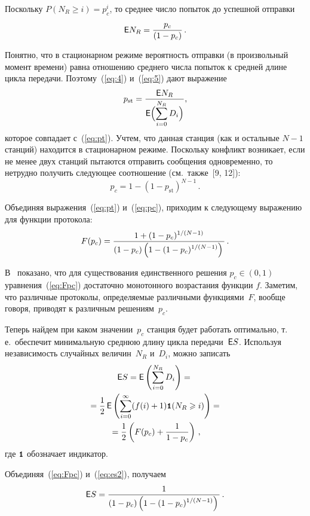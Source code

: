 \begin{multicols}{2}
Поскольку $P(N_R\ge i)= p_c^i$, то среднее число попыток до успешной
отправки 
\begin{eqnarray}
{\sf E} N_R =\displaystyle\frac{\displaystyle p_c\mathstrut}{\displaystyle (1-p_c)\mathstrut}\,. 
\label{eq:5}
\end{eqnarray}

Понятно, что в стационарном режиме вероятность отправки (в
произвольный момент времени) равна отношению среднего числа попыток
к средней длине цикла передачи. Поэтому~(\ref{eq:4}) и~(\ref {eq:5})
дают выражение
\begin{equation*}
p_{\mathrm{st}}=\displaystyle\frac{\displaystyle {\sf E} N_R\mathstrut}{\displaystyle {\sf E}\Bigl (\sum_{i=0}^{N_R}D_i\Bigr)\mathstrut},
\end{equation*}
которое совпадает с~(\ref{eq:pt}). Учтем, что данная станция (как
и остальные  $N-1$ станций) находится в стационарном режиме.
Поскольку конфликт возникает,  если не менее двух станций пытаются
отправить сообщения одновременно, то нетрудно получить следующее
соотношение (см.\ также~[9, 12]):
\begin{equation}
  p_c=1-(1-p_{\mathrm{st}})^{N-1}\,.
  \label{eq:pc}
\end{equation}

Объединяя выражения~(\ref{eq:pt}) и~(\ref{eq:pc}), приходим к
следующему выражению для функции протокола:
\begin{equation}
   F(p_c) = \displaystyle\frac{\displaystyle 1+(1-p_c)^{1/(N-1)}\mathstrut}{\displaystyle (1-p_c)\left(1-(1-p_c)^{1/(N-1)}\right)\mathstrut}\,.
   \label{eq:Fpc}
\end{equation}

В~\cite{LUKYA} показано, что для существования единственного решения
$p_c\in (0,1)$ уравнения~(\ref{eq:Fpc}) достаточно   монотонного
возрастания функции $f$. Заметим, что различные протоколы,
определяемые различными функциями~$F$, вообще говоря, приводят к различным решениям~$p_c$.

Теперь  найдем  при каком значении~$p_c$ станция будет работать
оптимально, т.\,е.\ обеспечит минимальную  среднюю  длину  цикла
передачи~${\sf E} S$.   Используя независимость случайных величин~$N_R$ и~$D_i$, 
можно записать
\begin{multline}
   {\sf E} S   = {\sf E} \left (\sum_{i=0}^{N_R}D_i\right)
        ={}\\
        {}= \displaystyle\frac{\displaystyle 1\mathstrut}{\displaystyle 2\mathstrut}\,{\sf E} \left(\sum_{i=0}^{\infty}(f(i)+1)\mbox{{\small \tt {1}}\hspace{-1.5mm}{\tt 1}} (N_R\geqslant
        i)\right)={}\\
{}=\displaystyle\frac{\displaystyle 1\mathstrut}{\displaystyle 2\mathstrut} \left( F(p_c) +\displaystyle\frac{\displaystyle 1\mathstrut}{\displaystyle 1-p_c\mathstrut}\right)\,,
       \label{eq:es2}
\end{multline}
где $\mbox{{\small \tt {1}}\hspace{-1.5mm}{\tt 1}}$ обозначает индикатор. 

Объединяя~(\ref{eq:Fpc}) и~(\ref{eq:es2}), получаем
\begin{equation}
   {\sf E} S  = \displaystyle\frac{\displaystyle 1\mathstrut}{\displaystyle (1-p_c)\left(1-(1-p_c)^{1/(N-1)}\right)\mathstrut}\,. 
   \label{eq:eqm}
\end{equation}


\end{multicols}
